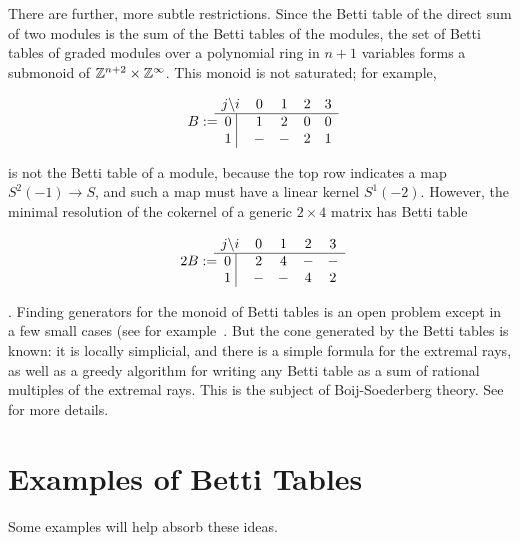 There are further, more subtle restrictions. Since the Betti table of the direct sum of two modules is the sum of the Betti tables of the modules, 
the set of Betti tables of graded modules over a polynomial ring in $n+1$ variables forms a submonoid of 
${\mathbb Z}^{n+2} \times {\mathbb Z}^{\infty}$. This monoid is not saturated; for example, 
\begin{small}
$$
B := \begin{matrix}
j \backslash i &0&1&2&3\\ \hline
\text{0 }\vline &1&2&0&0\\
\text{1 }\vline &-&-&2&1\\
\end{matrix}
$$
\end{small}
is not the Betti table of a module, because the top row indicates a map $S^{2}(-1) \to S$, and such
a map must have a linear kernel $S^{1}(-2)$. However, the minimal resolution of the cokernel
of a generic $2\times 4$ matrix has Betti table
\begin{small}
$$
2B := \begin{matrix}
j \backslash i &0&1&2&3\\ \hline
\text{0 }\vline &2&4&-&-\\
\text{1 }\vline &-&-&4&2\\
\end{matrix}
$$
\end{small}.
Finding generators for the monoid of Betti tables is an open problem except in a few small cases (see for example~\cite{Erman-semigroup}. But the cone generated by the Betti tables is known: it is locally simplicial, and there is a simple formula for the extremal rays, as well as a greedy algorithm for writing any Betti table as a sum of rational multiples of the extremal rays. This is the subject of Boij-Soederberg theory. See~\cite{Eisenbud-Schreyer Betti numbers of graded modules and cohomology of vector bundles} for more details.

\section{Examples of Betti Tables}
Some examples will help absorb these ideas.


